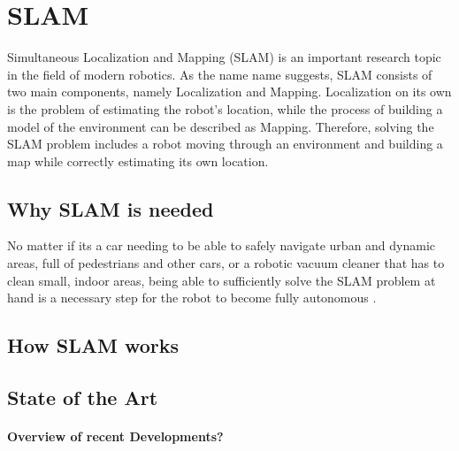 \documentclass[main.tex]{subfiles}
\begin{document}
\section{SLAM}
Simultaneous Localization and Mapping (SLAM) is an important research topic in the field of modern robotics. As the name name suggests, SLAM consists of two main components, namely Localization and Mapping. Localization on its own is the problem of estimating the robot's location, while the process of building a model of the environment can be described as Mapping. Therefore, solving the SLAM problem includes a robot moving through an environment and building a map while correctly estimating its own location.

\subsection*{Why SLAM is needed}
No matter if its a car needing to be able to safely navigate urban and dynamic areas, full of pedestrians and other cars, or a robotic vacuum cleaner that has to clean small, indoor areas, being able to sufficiently solve the SLAM problem at hand is a necessary step for the robot to become fully autonomous \cite{Durrant_Whyte_Bailey_2006}.
\subsection*{How SLAM works}

\subsection*{State of the Art}
\paragraph{Overview of recent Developments?}
\end{document}
